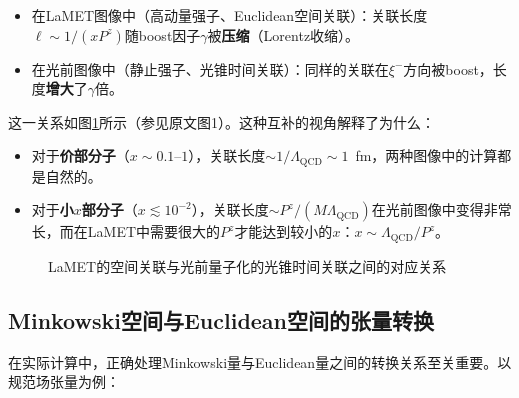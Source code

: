 \documentclass[12pt,a4paper]{ctexart}
\theoremstyle{definition}
\begin{document}
\begin{itemize}
    \item 在LaMET图像中（高动量强子、Euclidean空间关联）：关联长度$\ell \sim 1/(xP^z)$随boost因子$\gamma$被\textbf{压缩}（Lorentz收缩）。
    \item 在光前图像中（静止强子、光锥时间关联）：同样的关联在$\xi^-$方向被boost，长度\textbf{增大}了$\gamma$倍。
\end{itemize}

这一关系如图\ref{fig:spacetime}所示（参见原文\cite{Ji2014LaMET}图1）。这种互补的视角解释了为什么：

\begin{itemize}
    \item 对于\textbf{价部分子}（$x \sim 0.1\text{--}1$），关联长度$\sim 1/\Lambda_{\text{QCD}} \sim 1$~fm，两种图像中的计算都是自然的。
    \item 对于\textbf{小$x$部分子}（$x \lesssim 10^{-2}$），关联长度$\sim P^z/(M\Lambda_{\text{QCD}})$在光前图像中变得非常长，而在LaMET中需要很大的$P^z$才能达到较小的$x$：$x \sim \Lambda_{\text{QCD}}/P^z$。
\end{itemize}

\begin{figure}[H]
\centering
{}
\caption{LaMET的空间关联与光前量子化的光锥时间关联之间的对应关系}
\label{fig:spacetime}
\end{figure}

\subsection{Minkowski空间与Euclidean空间的张量转换}

在实际计算中，正确处理Minkowski量与Euclidean量之间的转换关系至关重要\cite{NoteGluonPDFs}。以规范场张量为例：
\end{document}

